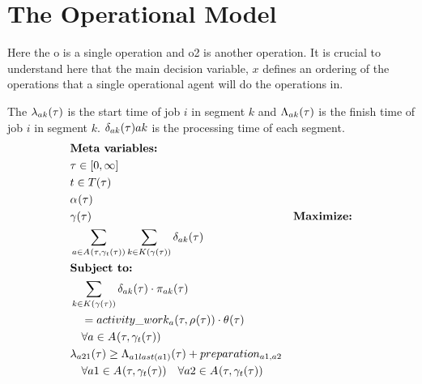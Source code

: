 \section{The Operational Model}

Here the o is a single operation and o2 is another operation. It is crucial to understand here that the main
decision variable, $x$ defines an ordering of the operations that a single operational agent will do the 
operations in. 

The $\lambda_{ak}(\tau)$ is the start time of job $i$ in segment $k$ and $\Lambda_{ak}(\tau)$ is the finish time of job $i$ in segment $k$.
$\delta_{ak}(\tau){a}{k}$ is the processing time of each segment. 
\begin{alignat}{2}
	& \textbf{Meta variables:} \notag\\
	& \tau \in [0, \infty] \notag\\
	& \ElementTechnician \in \SetTechnician \notag\\
	& \VarStrategicWorkOrderAssignment{}{} \notag\\
	& \VarSupervisorAssignment{}{}
	& \textbf{Maximize:} \notag\\
	& \sum_{\ElementActivity \in \SetActivity{\VarSupervisorAssignment{}{\ElementTechnician}}{}} \sum_{\ElementWorkSegment \in \SetWorkSegment} \VarProcessingTime                                                         \\
	& \textbf{Subject to:} \notag                                                                                                                                       \\
    & \sum_{\ElementWorkSegment \in \SetWorkSegment} \VarProcessingTime \cdot \VarActiveSegment{\ElementActivity}{\ElementWorkSegment} \notag\\ 
	& \quad = \ParActivityWork{} \cdot \VarIncludeActivity \notag\\
	& \quad \forall \ElementActivity \in \SetActivity{\VarSupervisorAssignment{}{\ElementTechnician}}{} \\
	& \VarStartOfSegment{\ElementActivity2}{1} \geq \VarFinishOfSegment{\ElementActivity1}{last(\ElementActivity1)} + \ParPreparation \notag                                                                       \\ 
	& \quad \forall \ElementActivity1 \in \SetActivity{\VarSupervisorAssignment{}{\ElementTechnician}}{} \quad \forall \ElementActivity2 \in \SetActivity{\VarSupervisorAssignment{}{\ElementTechnician}}{}                                                     \\

\end{alignat}
